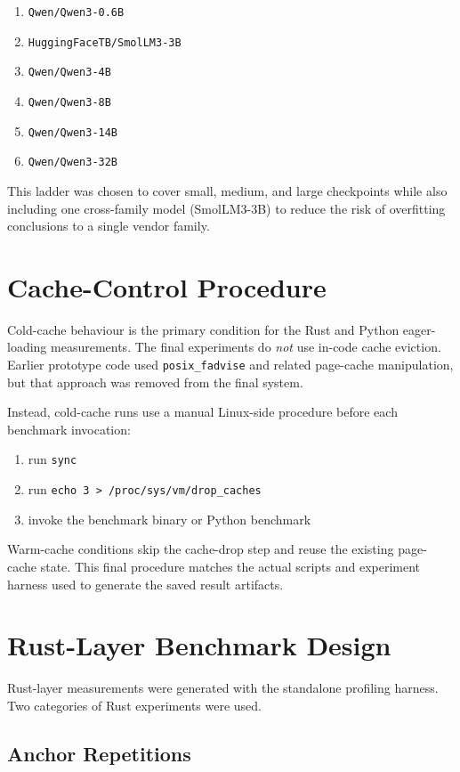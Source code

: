 \begin{enumerate}
\item \texttt{Qwen/Qwen3-0.6B}
\item \texttt{HuggingFaceTB/SmolLM3-3B}
\item \texttt{Qwen/Qwen3-4B}
\item \texttt{Qwen/Qwen3-8B}
\item \texttt{Qwen/Qwen3-14B}
\item \texttt{Qwen/Qwen3-32B}
\end{enumerate}

This ladder was chosen to cover small, medium, and large checkpoints while also including one cross-family model (SmolLM3-3B) to reduce the risk of overfitting conclusions to a single vendor family.

\section{Cache-Control Procedure}

Cold-cache behaviour is the primary condition for the Rust and Python eager-loading measurements. The final experiments do \emph{not} use in-code cache eviction. Earlier prototype code used \texttt{posix\_fadvise} and related page-cache manipulation, but that approach was removed from the final system.

Instead, cold-cache runs use a manual Linux-side procedure before each benchmark invocation:

\begin{enumerate}
\item run \texttt{sync}
\item run \texttt{echo 3 > /proc/sys/vm/drop\_caches}
\item invoke the benchmark binary or Python benchmark
\end{enumerate}

Warm-cache conditions skip the cache-drop step and reuse the existing page-cache state. This final procedure matches the actual scripts and experiment harness used to generate the saved result artifacts.

\section{Rust-Layer Benchmark Design}

Rust-layer measurements were generated with the standalone profiling harness. Two categories of Rust experiments were used.

\subsection{Anchor Repetitions}

